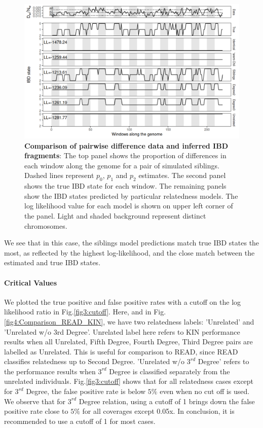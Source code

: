 \documentclass[12pt, letterpaper]{article}
\begin{document}
\begin{figure}[h!]
    \includegraphics[width=16cm]{plots/plotimg/IBDplot.png}
    \centering
    \caption{\textbf{Comparison of pairwise difference data  and inferred IBD fragments}:  The top panel shows the proportion of differences in each window along the genome for a pair of simulated siblings. Dashed lines represent $p_0$, $p_1$ and $p_2$ estimates. The second panel shows the true IBD state for each window. The remaining panels show the IBD states predicted by particular relatedness models. The log likelihood value for each model is shown on upper left corner of the panel. Light and shaded background represent distinct chromosomes.}
    \label{fig1:ibd}
\end{figure}

We see that in this case, the siblings model predictions match true IBD states the most, as reflected by the highest log-likelihood, and the close match between the estimated and true IBD states. 


\paragraph{Critical Values}
 We plotted the true positive and false positive rates with a cutoff on the log likelihood ratio in Fig.\ref{fig3:cutoff}. Here, and in Fig.\ref{fig4:Comparison_READ_KIN}, we have two relatedness labels: 'Unrelated' and 'Unrelated w/o 3rd Degree'. Unrelated label here refers to KIN performance results when all Unrelated, Fifth Degree, Fourth Degree, Third Degree pairs are labelled as Unrelated. This is useful for comparison to READ, since READ classifies relatedness up to Second Degree. 'Unrelated w/o $3^{rd}$ Degree' refers to the performance results when $3^{rd}$ Degree is classified separately from the unrelated individuals. Fig.\ref{fig3:cutoff} shows that for all relatedness cases except for $3^{rd}$ Degree, the false positive rate is below $5\%$ even when no cut off is used. We observe that for $3^{rd}$ Degree relation, using a cutoff of 1 brings down the false positive rate close to $5\%$ for all coverages except 0.05x. In conclusion, it is recommended to use a cutoff of 1 for most cases.
\end{document}
